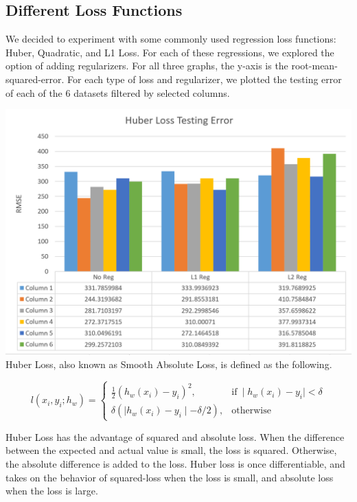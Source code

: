 \documentclass{article}
\begin{document}
\subsection{Different Loss Functions}

We decided to experiment with some commonly used regression loss functions: Huber, Quadratic, and L1 Loss. For each of these regressions, we explored the option of adding regularizers. For all three graphs, the y-axis is the root-mean-squared-error. For each type of loss and regularizer, we plotted the testing error of each of the 6 datasets filtered by selected columns. 


\includegraphics[width=\textwidth]{HuberLoss}
Huber Loss, also known as Smooth Absolute Loss, is defined as the following.

  \begin{equation}
    l(x_i, y_i; h_w)=
    \begin{cases}
      \frac{1}{2}(h_w(x_i) - y_i)^2, & \text{if}\  \mid h_w(x_i) - y_i \mid < \delta \\
      \delta(\mid h_w(x_i) - y_i \mid - \delta/2), & \text{otherwise}
    \end{cases}
  \end{equation}
  
Huber Loss has the advantage of squared and absolute loss. When the difference between the expected and actual value is small, the loss is squared. Otherwise, the absolute difference is added to the loss. Huber loss is once differentiable, and takes on the behavior of squared-loss when the loss is small, and absolute loss when the loss is large. 
\end{document}
